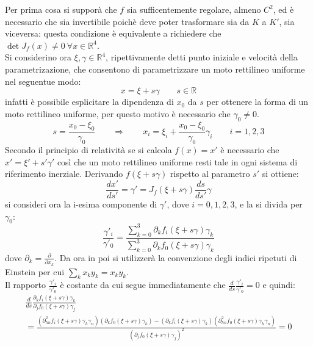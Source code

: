 Per prima cosa si supporà che $f$ sia sufficentemente regolare, almeno $C^2$, ed è necessario che sia invertibile poichè deve poter 
trasformare sia da $K$ a $K'$, sia viceversa: questa condizione è equivalente a richiedere che $\det J_f(x)\neq 0\ \forall x\in\mathbb{R}^4$.\\

Si considerino ora $\xi, \gamma \in \mathbb{R}^4$, ripettivamente detti punto iniziale e velocità della parametrizazione, 
che consentono di parametrizzare un moto rettilineo uniforme nel seguentue modo:
\begin{equation*}
    x=\xi+s\gamma \qquad s\in \mathbb{R}
\end{equation*}
infatti è possibile esplicitare la dipendenza di $x_0$ da $s$ per ottenere la forma di un moto rettilineo uniforme, per questo motivo è necessario che $\gamma_0\neq 0$. 
\begin{equation*}
    s=\frac{x_0-\xi_0}{\gamma_0} \qquad \Rightarrow \qquad x_i=\xi_i+\frac{x_0-\xi_0}{\gamma_0}\gamma_i \qquad i=1,2,3
\end{equation*}
Secondo il principio di relatività se si calcola $f(x)=x'$ è necessario che $x'=\xi'+s'\gamma'$ così che un moto rettilineo uniforme resti tale in ogni sistema 
di riferimento inerziale. Derivando $f(\xi+s\gamma)$ rispetto al parametro $s'$ si ottiene:
\begin{equation*}
    \frac{dx'}{ds'}=\gamma'=J_f(\xi+s\gamma)\frac{ds}{ds'}\gamma
\end{equation*}
si consideri ora la i-esima componente di $\gamma'$, dove $i=0,1,2,3$, e la si divida per $\gamma_0$:
\begin{equation*}
    \frac{\gamma'_i}{\gamma'_0}=\frac{\sum_{k=0}^3\partial_kf_i(\xi+s\gamma)\gamma_k}{\sum_{k=0}^3\partial_kf_0(\xi+s\gamma)\gamma_k}
    \label{ARappGamma}
\end{equation*} 
dove $\partial_k=\frac{\partial}{\partial x_k}$. Da ora in poi si utilizzerà la convenzione degli indici ripetuti di Einstein per cui $\sum_k x_k y_k=x_k y_k$.\\
Il rapporto $\frac{\gamma'_i}{\gamma'_0}$ è costante da cui segue immediatamente che $\frac{d}{ds}\frac{\gamma'_i}{\gamma'_0}=0$  e quindi:
\begin{equation*}
    \begin{gathered}
        \frac{d}{ds}\frac{\partial_kf_i(\xi+s\gamma)\gamma_k}{\partial_jf_0(\xi+s\gamma)\gamma_j}\\
    =\frac{\left(\partial^2_{hn}f_i(\xi+s\gamma)\gamma_h\gamma_n\right)\left(\partial_kf_0(\xi+s\gamma)\gamma_k\right)
    - \left(\partial_kf_i(\xi+s\gamma)\gamma_k\right)\left(\partial^2_{hn}f_0(\xi+s\gamma)\gamma_h\gamma_n\right)}{\left(\partial_jf_0(\xi+s\gamma)\gamma_j\right)^2}=0    
\end{gathered}
\end{equation*}
